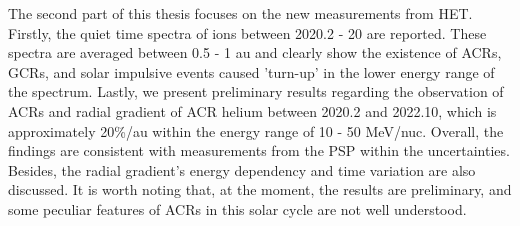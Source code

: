 The second part of this thesis focuses on the new measurements from \ac{HET}. Firstly, the quiet time spectra of ions between 2020.2 - 20 are reported. These spectra are averaged between 0.5 - 1 au and clearly show the existence of \acp{ACR}, \acp{GCR}, and solar impulsive events caused 'turn-up' in the lower energy range of the spectrum. Lastly, we present preliminary results regarding the observation of \acp{ACR} and radial gradient of \ac{ACR} helium between 2020.2 and 2022.10, which is approximately 20\%/au within the energy range of 10 - 50 MeV/nuc. Overall, the findings are consistent with measurements from the \ac{PSP} within the uncertainties. Besides, the radial gradient's energy dependency and time variation are also discussed. It is worth noting that, at the moment, the results are preliminary, and some peculiar features of \acp{ACR} in this solar cycle are not well understood.




